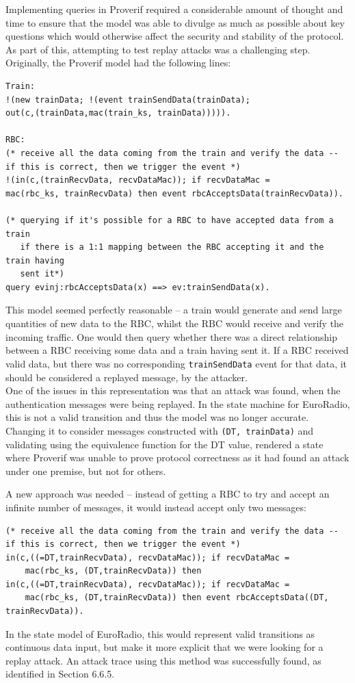\documentclass[twoside,11pt,a4paper]{article}
\begin{document}
Implementing queries in Proverif required a considerable amount of thought and time to ensure that the model was able to divulge as much as possible about key questions which would otherwise affect the security and stability of the protocol. As part of this, attempting to test replay attacks was a challenging step. Originally, the Proverif model had the following lines:
\begin{verbatim}
Train:
!(new trainData; !(event trainSendData(trainData);
out(c,(trainData,mac(train_ks, trainData))))).

RBC:
(* receive all the data coming from the train and verify the data --
if this is correct, then we trigger the event *)
!(in(c,(trainRecvData, recvDataMac)); if recvDataMac =
mac(rbc_ks, trainRecvData) then event rbcAcceptsData(trainRecvData)).

(* querying if it's possible for a RBC to have accepted data from a train
   if there is a 1:1 mapping between the RBC accepting it and the train having
   sent it*)
query evinj:rbcAcceptsData(x) ==> ev:trainSendData(x).
\end{verbatim}

This model seemed perfectly reasonable -- a train would generate and send large quantities of new data to the RBC, whilst the RBC would receive and verify the incoming traffic. One would then query whether there was a direct relationship between a RBC receiving some data and a train having sent it. If a RBC received valid data, but there was no corresponding \texttt{trainSendData} event for that data, it should be considered a replayed message, by the attacker.\\
One of the issues in this representation was that an attack was found, when the authentication messages were being replayed. In the state machine for EuroRadio, this is not a valid transition and thus the model was no longer accurate. Changing it to consider messages constructed with \texttt{(DT, trainData)} and validating using the equivalence function for the DT value, rendered a state where Proverif was unable to prove protocol correctness as it had found an attack under one premise, but not for others.

A new approach was needed -- instead of getting a RBC to try and accept an infinite number of messages, it would instead accept only two messages:
\begin{verbatim}
(* receive all the data coming from the train and verify the data --
if this is correct, then we trigger the event *)
in(c,((=DT,trainRecvData), recvDataMac)); if recvDataMac =
	mac(rbc_ks, (DT,trainRecvData)) then
in(c,((=DT,trainRecvData), recvDataMac)); if recvDataMac =
	mac(rbc_ks, (DT,trainRecvData)) then event rbcAcceptsData((DT, trainRecvData)).
\end{verbatim}
In the state model of EuroRadio, this would represent valid transitions as continuous data input, but make it more explicit that we were looking for a replay attack. An attack trace using this method was successfully found, as identified in Section 6.6.5.
\end{document}
